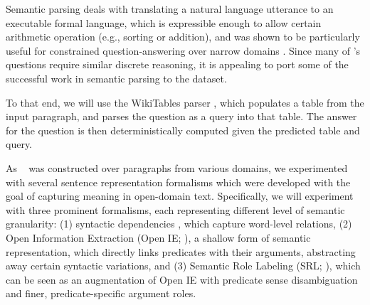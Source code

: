 
Semantic parsing deals with translating a natural language utterance to
an executable formal language, which is expressible enough to allow certain arithmetic
operation (e.g., sorting or addition),  and
was shown to be particularly useful for constrained question-answering
over narrow domains \cite{Zelle1996LearningTP,Zettlemoyer2005LearningTM,Berant2014ModelingBP}.
Since many of \drop's questions require similar discrete reasoning, it is appealing
to port some of the successful work in semantic parsing to the \drop dataset.

To that end, we will use the WikiTables parser \cite{Krishnamurthy2017neuralsp},
which populates a table from the input paragraph, and
parses the question as a query into that table.
The answer for the question is then deterministically computed given the predicted table
and query.

As \drop~ was constructed over paragraphs from various domains,
we experimented with several sentence representation formalisms which were
developed with the goal of capturing meaning in open-domain text.
Specifically, we will experiment with three prominent formalisms, each
representing different level of semantic granularity:
(1) syntactic dependencies \cite{sd}, which capture word-level relations,
(2) Open Information Extraction (Open IE; \cite{oie}), a shallow
form of semantic representation, which directly links predicates
with their arguments, abstracting away certain syntactic variations, and
(3) Semantic Role Labeling (SRL; \cite{srl}), which can be seen as an
augmentation of Open IE with predicate sense disambiguation and finer, predicate-specific
argument roles.


